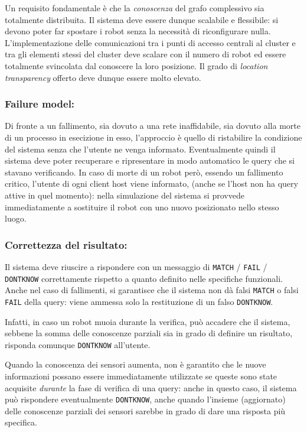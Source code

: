 Un requisito fondamentale è che
la \emph{conoscenza} del grafo complessivo sia totalmente distribuita.
Il sistema deve essere dunque scalabile e flessibile:
si devono poter far spostare i robot senza la necessità di
riconfigurare nulla. L'implementazione delle
comunicazioni tra i punti di accesso centrali al cluster e
tra gli elementi stessi del cluster
deve scalare con il numero di robot ed essere totalmente
svincolata dal conoscere la loro posizione.
Il grado di \emph{location transparency} offerto
deve dunque essere molto elevato.

\subsubsection*{Failure model:}
Di fronte a un fallimento, sia dovuto a una rete inaffidabile,
sia dovuto alla morte di un processo in esecizione in esso,
l'approccio è quello di ristabilire la
condizione del sistema senza che
l'utente ne venga informato. Eventualmente quindi il sistema deve poter
recuperare e ripresentare in modo automatico le query che si stavano
verificando. In caso di morte di un robot però,
essendo un fallimento critico, l'utente di ogni client host viene informato,
(anche se l'host non ha query attive in quel momento):
nella simulazione del sistema si provvede immediatamente a
sostituire il robot con uno nuovo posizionato nello stesso luogo.

\subsubsection*{Correttezza del risultato:}
Il sistema deve riuscire a rispondere con un messaggio di
\texttt{MATCH} / \texttt{FAIL} / \texttt{DONTKNOW} correttamente
rispetto a quanto definito nelle specifiche funzionali.
Anche nel caso di fallimenti, si garantisce che
il sistema non dà falsi \texttt{MATCH} o falsi \texttt{FAIL} della query:
viene ammessa solo la restituzione di un falso \texttt{DONTKNOW}.

Infatti,
in caso un robot muoia durante la verifica, può accadere che il sistema,
sebbene la somma delle conoscenze parziali sia in grado di definire
un risultato, risponda comunque \texttt{DONTKNOW} all'utente.

Quando la conoscenza dei sensori aumenta,
non è garantito che le nuove informazioni possano essere immediatamente
utilizzate se queste sono state acquisite \emph{durante} la fase di verifica
di una query: anche in questo caso, il sistema può rispondere eventualmente
\texttt{DONTKNOW}, anche quando l'insieme (aggiornato) delle conoscenze
parziali dei sensori sarebbe in grado di dare una risposta più specifica.

